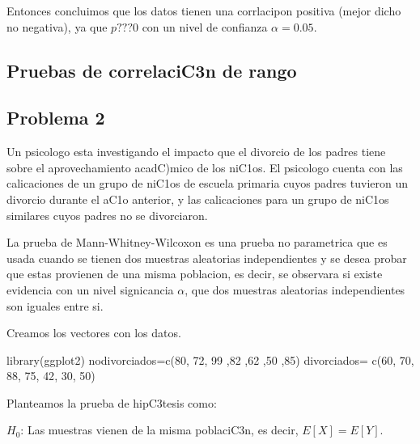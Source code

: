 \documentclass[
]{article}
\newenvironment{Shaded}{\begin{snugshade}}{\end{snugshade}}
\newcommand{\DecValTok}[1]{\textcolor[rgb]{0.00,0.00,0.81}{#1}}
\newcommand{\FunctionTok}[1]{\textcolor[rgb]{0.00,0.00,0.00}{#1}}
\newcommand{\NormalTok}[1]{#1}
\newcommand{\OtherTok}[1]{\textcolor[rgb]{0.56,0.35,0.01}{#1}}
\begin{document}
Entonces concluimos que los datos tienen una corrlacipon positiva (mejor
dicho no negativa), ya que \(p???0\) con un nivel de confianza
\(\alpha=0.05\).

\hypertarget{pruebas-de-correlacic3n-de-rango}{%
\subsection{Pruebas de correlaciC3n de
rango}\label{pruebas-de-correlacic3n-de-rango}}

\hypertarget{problema-2}{%
\subsection{Problema 2}\label{problema-2}}

Un psicologo esta investigando el impacto que el divorcio de los padres
tiene sobre el aprovechamiento acadC)mico de los niC1os. El psicologo
cuenta con las calicaciones de un grupo de niC1os de escuela primaria
cuyos padres tuvieron un divorcio durante el aC1o anterior, y las
calicaciones para un grupo de niC1os similares cuyos padres no se
divorciaron.

La prueba de Mann-Whitney-Wilcoxon es una prueba no parametrica que es
usada cuando se tienen dos muestras aleatorias independientes y se desea
probar que estas provienen de una misma poblacion, es decir, se
observara si existe evidencia con un nivel signicancia \(\alpha\), que
dos muestras aleatorias independientes son iguales entre si.

Creamos los vectores con los datos.

\begin{Shaded}
\begin{Highlighting}[]
\FunctionTok{library}\NormalTok{(ggplot2)}
\NormalTok{nodivorciados}\OtherTok{=}\FunctionTok{c}\NormalTok{(}\DecValTok{80}\NormalTok{, }\DecValTok{72}\NormalTok{, }\DecValTok{99}\NormalTok{ ,}\DecValTok{82}\NormalTok{ ,}\DecValTok{62}\NormalTok{ ,}\DecValTok{50}\NormalTok{ ,}\DecValTok{85}\NormalTok{)}
\NormalTok{divorciados}\OtherTok{=} \FunctionTok{c}\NormalTok{(}\DecValTok{60}\NormalTok{, }\DecValTok{70}\NormalTok{, }\DecValTok{88}\NormalTok{, }\DecValTok{75}\NormalTok{, }\DecValTok{42}\NormalTok{, }\DecValTok{30}\NormalTok{, }\DecValTok{50}\NormalTok{)}
\end{Highlighting}
\end{Shaded}

Planteamos la prueba de hipC3tesis como:

\(H_{0}\): Las muestras vienen de la misma poblaciC3n, es decir,
\(E[X]=E[Y]\).
\end{document}
